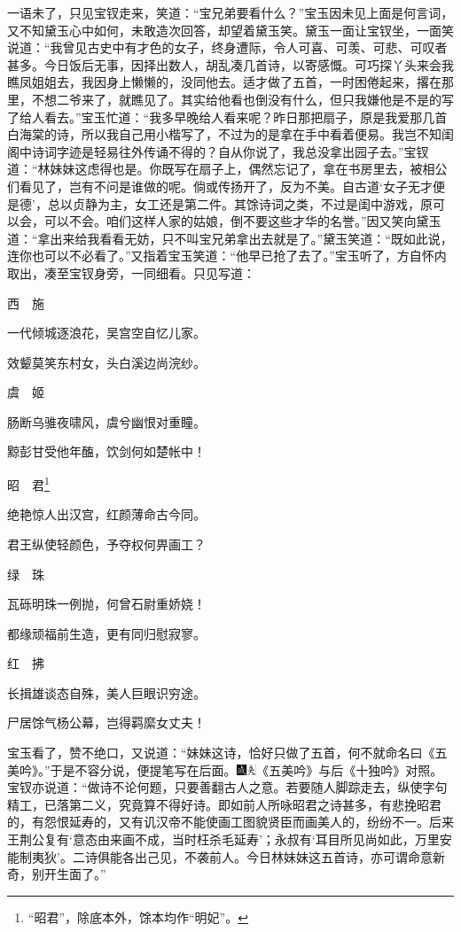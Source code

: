 一语未了，只见宝钗走来，笑道：“宝兄弟要看什么？”宝玉因未见上面是何言词，又不知黛玉心中如何，未敢造次回答，却望着黛玉笑。黛玉一面让宝钗坐，一面笑说道：“我曾见古史中有才色的女子，终身遭际，令人可喜、可羡、可悲、可叹者甚多。今日饭后无事，因择出数人，胡乱凑几首诗，以寄感慨。可巧探丫头来会我瞧凤姐姐去，我因身上懒懒的，没同他去。适才做了五首，一时困倦起来，撂在那里，不想二爷来了，就瞧见了。其实给他看也倒没有什么，但只我嫌他是不是的写了给人看去。”宝玉忙道：“我多早晚给人看来呢？昨日那把扇子，原是我爱那几首白海棠的诗，所以我自己用小楷写了，不过为的是拿在手中看着便易。我岂不知闺阁中诗词字迹是轻易往外传诵不得的？自从你说了，我总没拿出园子去。”宝钗道：“林妹妹这虑得也是。你既写在扇子上，偶然忘记了，拿在书房里去，被相公们看见了，岂有不问是谁做的呢。倘或传扬开了，反为不美。自古道‘女子无才便是德’，总以贞静为主，女工还是第二件。其馀诗词之类，不过是闺中游戏，原可以会，可以不会。咱们这样人家的姑娘，倒不要这些才华的名誉。”因又笑向黛玉道：“拿出来给我看看无妨，只不叫宝兄弟拿出去就是了。”黛玉笑道：“既如此说，连你也可以不必看了。”又指着宝玉笑道：“他早已抢了去了。”宝玉听了，方自怀内取出，凑至宝钗身旁，一同细看。只见写道：

西　施

一代倾城逐浪花，吴宫空自忆儿家。

效颦莫笑东村女，头白溪边尚浣纱。

虞　姬

肠断乌骓夜啸风，虞兮幽恨对重瞳。

黥彭甘受他年醢，饮剑何如楚帐中！

昭　君\footnote{“昭君”，除底本外，馀本均作“明妃”。}

绝艳惊人出汉宫，红颜薄命古今同。

君王纵使轻颜色，予夺权何畀画工？

绿　珠

瓦砾明珠一例抛，何曾石尉重娇娆！

都缘顽福前生造，更有同归慰寂寥。

红　拂

长揖雄谈态自殊，美人巨眼识穷途。

尸居馀气杨公幕，岂得羁縻女丈夫！

宝玉看了，赞不绝口，又说道：“妹妹这诗，恰好只做了五首，何不就命名曰《五美吟》。”于是不容分说，便提笔写在后面。{\includegraphics[width=3mm]{../Images/00005}\includegraphics[width=3mm]{../Images/00012}\footnotesize \kaishu 《五美吟》与后《十独吟》对照。}宝钗亦说道：“做诗不论何题，只要善翻古人之意。若要随人脚踪走去，纵使字句精工，已落第二义，究竟算不得好诗。即如前人所咏昭君之诗甚多，有悲挽昭君的，有怨恨延寿的，又有讥汉帝不能使画工图貌贤臣而画美人的，纷纷不一。后来王荆公复有‘意态由来画不成，当时枉杀毛延寿’；永叔有‘耳目所见尚如此，万里安能制夷狄’。二诗俱能各出己见，不袭前人。今日林妹妹这五首诗，亦可谓命意新奇，别开生面了。”

